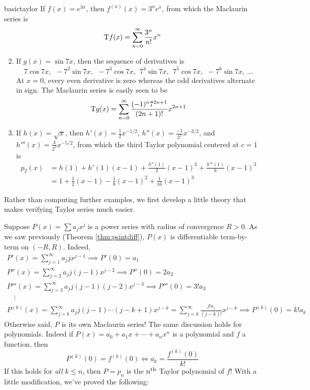 \begin{examples}{}{basictaylor}
	\exstart If $f(x)=e^{3x}$, then $f^{(n)}(x)=3^ne^x$, from which the Maclaurin series is
	\[
	  \mathrm{T} f(x)=\sum_{n=0}^\infty\frac{3^n}{n!}x^n
	\]
	\begin{enumerate}\setcounter{enumi}{1}
	  \item If $g(x)=\sin 7x$, then the sequence of derivatives is
	  \[
	  	7\cos 7x,\ \ -7^2\sin 7x,\ \ -7^3\cos 7x,\ \ 7^4\sin 7x,\ \ 7^5\cos 7x,\ \ -7^6\sin 7x,\ \ldots
	  \]
		At $x=0$, every even derivative is zero whereas the odd derivatives alternate in sign. The Maclaurin series is easily seen to be
	  \[
	  	\mathrm{T} g(x)=\sum_{n=0}^\infty\frac{(-1)^n7^{2n+1}}{(2n+1)!}x^{2n+1}
	  \]
	  
	  \item\label{ex:basictaylor3} If $h(x)=\sqrt x$, then $h'(x)=\frac 12x^{-1/2}$, $h''(x)=\frac{-1}{2^2}x^{-3/2}$, and $h'''(x)=\frac{3}{2^3}x^{-5/2}$, from which the third Taylor polynomial centered at $c=1$ is
	  \begin{align*}
	  	p_2(x)&=h(1)+h'(1)(x-1)+\frac{h''(1)}{2}(x-1)^2+\frac{h'''(1)}{6}(x-1)^3\\
	  	&=1+\frac 12(x-1)-\frac 18(x-1)^2+\frac 1{16}(x-1)^3
	  \end{align*}
	\end{enumerate}
\end{examples}

Rather than computing further examples, we first develop a little theory that makes verifying Taylor series much easier.
\goodbreak


	
	
Suppose $P(x)=\sum a_jx^j$ is a power series with radius of convergence $R>0$. As we saw previously (Theorem \ref{thm:psintdiff}), $P(x)$ is differentiable term-by-term on $(-R,R)$. Indeed,
\begin{gather*}
	P'(x)=\sum_{j=1}^\infty a_jjx^{j-1} \implies P'(0)=a_1\\
	P''(x)=\sum_{j=2}^\infty a_jj(j-1)x^{j-2} \implies P''(0)=2a_2\\
	P'''(x)=\sum_{j=3}^\infty a_jj(j-1)(j-2)x^{j-3} \implies P'''(0)=3!a_3\\[-8pt]
	\quad\vdots\\[-3pt]
	P^{(k)}(x)=\sum_{j=k}^\infty a_jj(j-1)\cdots(j-k+1)x^{j-k}=\sum_{j=k}^\infty\frac{j!a_j}{(j-k)!}x^{j-k} \implies P^{(k)}(0)=k!a_k
\end{gather*}
Otherwise said, $P$ is its own Maclaurin series! The same discussion holds for polynomials. Indeed if $P(x)=a_0+a_1x+\cdots+a_nx^n$ is a polynomial and $f$ a function, then
\[
	P^{(k)}(0)=f^{(k)}(0)\iff a_k=\frac{f^{(k)}(0)}{k!}
\]
If this holds for \emph{all} $k\le n$, then $P=p_n$ is the $n\textsuperscript{th}$ Taylor polynomial of $f$! With a little modification, we've proved the following:

